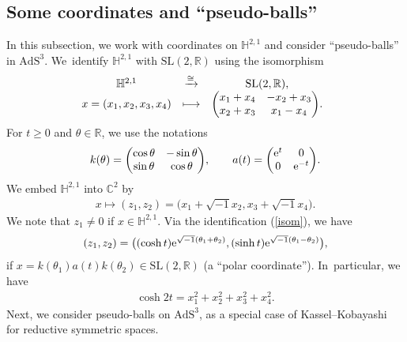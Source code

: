 \subsection{Some coordinates and ``pseudo-balls''}
In this subsection, we work with coordinates on $\mathbb{H}^{2,1}$ and
consider ``pseudo-balls'' in $\mathrm{AdS}^{3}$. We~identify
$\mathbb{H}^{2,1}$ with $\mathrm{SL}(2,\mathbb{R})$ using the isomorphism
\begin{align}
\begin{array}{@{}ccc}
\mathbb{H}^{2,1} & \xrightarrow{\cong} & \mathrm{SL}(2,\mathbb{R}), \\
x=(x_1,x_2,x_3,x_4) & \longmapsto & \begin{pmatrix}
x_1 + x_4 & -x_2 + x_3 \\
x_2 + x_3 & x_1 -x_4
\end{pmatrix}\!.\label{isom}
\end{array}
\end{align}
For $t\geq0$ and $\theta\in\mathbb{R}$, we use the notations
\begin{gather}
\label{k-a}
k(\theta) = \begin{pmatrix}
\cos\theta & -\sin\theta \\
\sin\theta & \cos\theta
\end{pmatrix}\!,\qquad
a(t) = \begin{pmatrix}
{\rm e}^t & 0 \\
0 & {\rm e}^{-t}
\end{pmatrix}\!.
\end{gather}
We embed $\mathbb{H}^{2,1}$ into $\mathbb{C}^{2}$ by
\begin{gather}
\label{embed}
x\mapsto (z_1,z_2) = \big(x_1 + \sqrt{-1}x_2, x_3 + \sqrt{-1}x_4\big).
\end{gather}
We note that $z_{1}\neq0$ if $x\in\mathbb{H}^{2,1}$.
Via the identification (\ref{isom}), we have
\begin{gather}
\label{polar}
(z_1,z_2) = \big((\cosh t){\rm e}^{\sqrt{-1}(\theta_1+\theta_2)},
(\sinh t){\rm e}^{\sqrt{-1}(\theta_1-\theta_2)}\big),
\end{gather}
if $x = k(\theta_1)a(t)k(\theta_2) \in \mathrm{SL}(2,\mathbb{R})$
(a ``polar coordinate''). In~particular, we have
\begin{gather*}
\cosh 2t = x_1^2 + x_2^2 + x_3^2 + x_4^2.
\end{gather*}
Next, we consider pseudo-balls on $\mathrm{AdS}^3$, as a special case of
Kassel--Kobayashi~\cite{KaKob16} for
reductive symmetric spaces.
